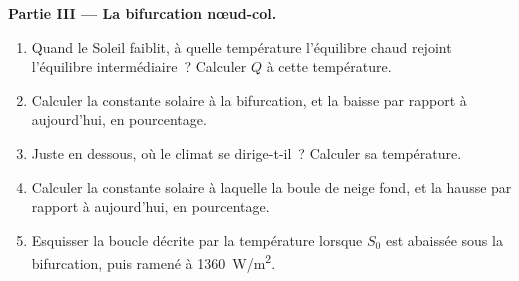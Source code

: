 \begin{problem}
\medskip\noindent\textbf{Partie III --- La bifurcation nœud-col.}
\begin{enumerate}[resume]
\item Quand le Soleil faiblit, à quelle température l'équilibre chaud rejoint
  l'équilibre intermédiaire~? Calculer $Q$ à cette température.
\item Calculer la constante solaire à la bifurcation, et la baisse par rapport à
  aujourd'hui, en pourcentage.
\item Juste en dessous, où le climat se dirige-t-il~? Calculer sa température.
\item Calculer la constante solaire à laquelle la boule de neige fond, et la hausse
  par rapport à aujourd'hui, en pourcentage.
\item Esquisser la boucle décrite par la température lorsque $S_0$ est abaissée
  sous la bifurcation, puis ramené à \qty{1360}{W/m^2}.
\end{enumerate}


\end{problem}
